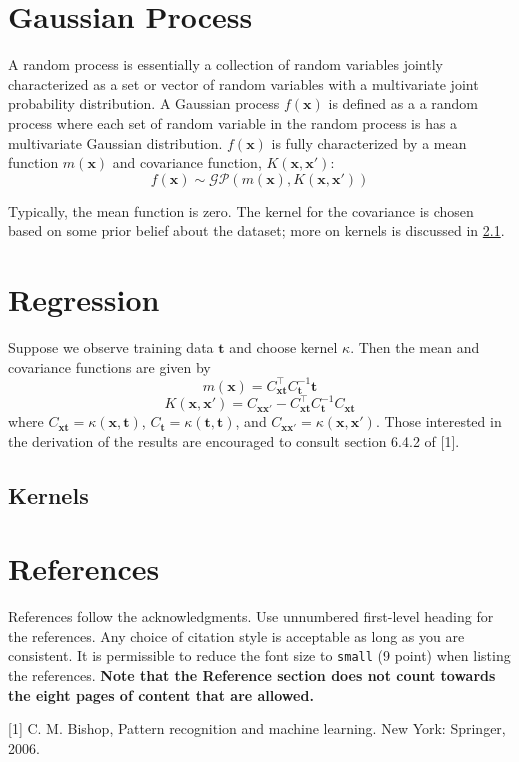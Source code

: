 \documentclass{article}
\begin{document}
\section{Gaussian Process}
A random process is essentially a collection of random variables jointly characterized  as a set or vector of random variables with a multivariate joint probability distribution. A Gaussian process $f(\boldsymbol{x})$ is defined as a a random process where each set of random variable in the random process is has a multivariate Gaussian distribution. $f(\boldsymbol{x})$ is fully characterized by a mean function  $m(\boldsymbol{x})$ and covariance function, $K(\boldsymbol{x},\boldsymbol{x'})$:
\[f(\boldsymbol{x})\sim\mathcal{GP}(m(\boldsymbol{x}),K(\boldsymbol{x},\boldsymbol{x'}))\]

Typically, the mean function is zero. The kernel for the covariance is chosen based on some prior belief about the dataset; more on kernels is discussed in \ref{subsection:kernels}.

\section{Regression}
Suppose we observe training data $\boldsymbol{t}$ and choose kernel $\kappa$. Then the mean and covariance functions are given by
\[m(\boldsymbol{x})=C_{\boldsymbol{x}\boldsymbol{t}}^\top C_{\boldsymbol{t}}^{-1}\boldsymbol{t}\]
\[K(\boldsymbol{x},\boldsymbol{x'})=C_{\boldsymbol{x}\boldsymbol{x'}}-C_{\boldsymbol{x}\boldsymbol{t}}^\top C_{\boldsymbol{t}}^{-1}C_{\boldsymbol{x}\boldsymbol{t}}\]
where $C_{\boldsymbol{x}\boldsymbol{t}} = \kappa(\boldsymbol{x},\boldsymbol{t})$, $C_{\boldsymbol{t}} = \kappa(\boldsymbol{t},\boldsymbol{t})$, and $C_{\boldsymbol{x}\boldsymbol{x'}} = \kappa(\boldsymbol{x},\boldsymbol{x'})$.
Those interested in the derivation of the results are encouraged to consult section 6.4.2 of [1].
\subsection{Kernels}
\label{subsection:kernels}

\section*{References}

References follow the acknowledgments. Use unnumbered first-level heading for
the references. Any choice of citation style is acceptable as long as you are
consistent. It is permissible to reduce the font size to \verb+small+ (9 point)
when listing the references.
{\bf Note that the Reference section does not count towards the eight pages of content that are allowed.}
\medskip

\small

[1] C. M. Bishop, Pattern recognition and machine learning. New York: Springer, 2006.
\end{document}
